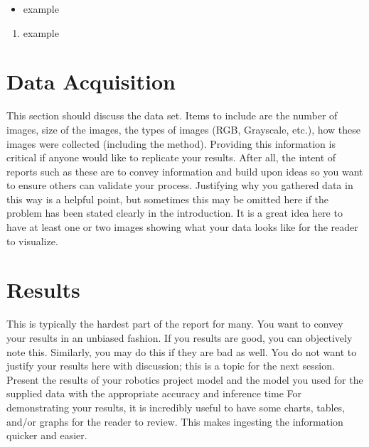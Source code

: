 \documentclass[10pt,journal,compsoc]{IEEEtran}
\begin{document}
		
		\begin{itemize}
			\item example
			\end {itemize}
			
			
			
			\begin{enumerate}
				\item example
				
			\end{enumerate}
			
			\section{Data Acquisition}
			This section should discuss the data set. Items to include are the number of images, size of the images, the types of images (RGB, Grayscale, etc.), how these images were collected (including the method). Providing this information is critical if anyone would like to replicate your results. After all, the intent of reports such as these are to convey information and build upon ideas so you want to ensure others can validate your process.
			Justifying why you gathered data in this way is a helpful point, but sometimes this may be omitted here if the problem has been stated clearly in the introduction.
			It is a great idea here to have at least one or two images showing what your data looks like for the reader to visualize.
			
			\section{Results}
			This is typically the hardest part of the report for many. You want to convey your results in an unbiased fashion. If you results are good, you can objectively note this. Similarly, you may do this if they are bad as well. You do not want to justify your results here with discussion; this is a topic for the next session. 
			Present the results of your robotics project model and the model you used for the supplied data with the appropriate accuracy and inference time
			For demonstrating your results, it is incredibly useful to have some charts, tables, and/or graphs for the reader to review. This makes ingesting the information quicker and easier.
			
\end{document}
